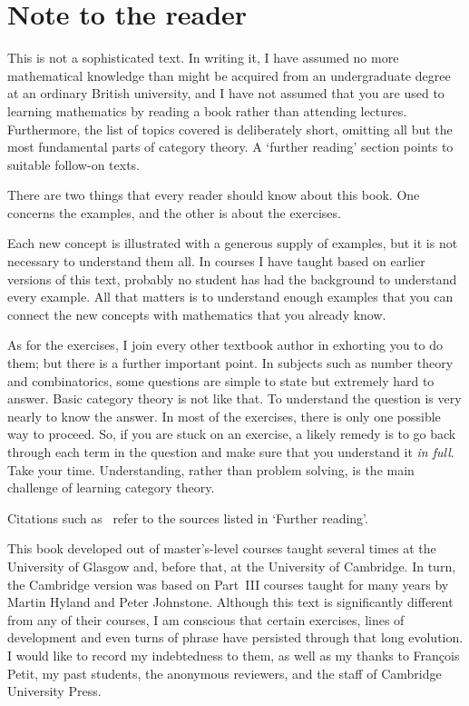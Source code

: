 % 
% 
% 

\chapter*{Note to the reader}
\label{ch:preface}


This is not a sophisticated text.  In writing it, I have assumed no more
mathematical knowledge than might be acquired from an undergraduate degree
at an ordinary British university, and I have not assumed that you are used
to learning mathematics by reading a book rather than attending lectures.
Furthermore, the list of topics covered is deliberately short, omitting all
but the most fundamental parts of category theory.  A `further reading'
section points to suitable follow-on texts.

There are two things that every reader should know about this book.  One
concerns the examples, and the other is about the exercises.

Each new concept is illustrated with a generous supply of examples, but it
is not necessary to understand them all.  In courses I have taught based on
earlier versions of this text, probably no student has had the background to
understand every example.  All that matters is to understand enough
examples that you can connect the new concepts with mathematics that you
already know.

As for the exercises, I join every other textbook author in exhorting you
to do them; but there is a further important point.  In subjects such as
number theory and combinatorics, some questions are simple to state but
extremely hard to answer.  Basic category theory is not like that.  To
understand the question is very nearly to know the answer.  In most of the
exercises, there is only one possible way to proceed.  So, if you are stuck
on an exercise, a likely remedy is to go back through each term in the
question and make sure that you understand it \emph{in full}.  Take your
time.  Understanding, rather than problem solving, is the main challenge of
learning category theory.

Citations such as \citeCWM\ refer to the sources listed in `Further
reading'.

This book developed out of master's-level courses taught several times at
the University of Glasgow and, before that, at the University of Cambridge.
In turn, the Cambridge version was based on Part~III courses taught for
many years by Martin Hyland and Peter Johnstone.  Although this text is
significantly different from any of their courses, I am conscious that
certain exercises, lines of development and even turns of phrase have
persisted through that long evolution.  I would like to record my
indebtedness to them, as well as my thanks to Fran\c{c}ois Petit, my past
students, the anonymous reviewers, and the staff of Cambridge University
Press.





